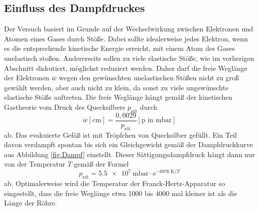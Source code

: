 \subsection{Einfluss des Dampfdruckes}
Der Versuch basiert im Grunde auf der Wechselwirkung zwischen Elektronen und Atomen eines Gases durch Stöße.
Dabei sollte idealerweise jedes Elektron, wenn es die entsprechende kinetische Energie erreicht, mit 
einem Atom des Gases unelastisch stoßen. Andererseits sollen zu viele elastische Stöße, wie im vorherigen Abschnitt diskutiert, möglichst 
reduziert werden. Daher darf die freie Weglänge der Elektronen $\overline{w}$ wegen den gewünschten 
unelastischen Stößen nicht zu groß gewählt werden, aber auch nicht zu klein, da sonst zu viele ungewünschte elastische Stöße auftreten. Die freie Weglänge hängt 
gemäß der kinetischen Gastheorie vom Druck des Quecksilbers $p_\text{sät}$ durch 
\begin{equation}
    \overline{w}[\text{cm}]=\frac{0,0029}{p_\text{sät}}[\text{p in mbar}]
    \label{eq:freieW}
\end{equation}
ab. Das evakuierte Gefäß ist mit Tröpfchen von Quecksilber gefüllt. Ein Teil davon 
verdampft spontan bis sich ein Gleichgewicht gemäß der Dampfdruckkurve aus Abbildung 
\ref{fig:Dampf} einstellt. Dieser Sättigungsdampfdruck hängt dann nur von der Temperatur $T$ 
gemäß der Formel 
\begin{equation}
    p_\text{sät}=\qty{5.5e7}{\milli\bar}\cdot \text{e}^{-\qty{6876}{\kelvin}/T}
    \label{eq:Druck}
\end{equation}
ab. Optimalerweise wird die Temperatur der Franck-Hertz-Apparatur so eingestellt, dass die freie Weglänge etwa 
1000 bis 4000 mal kleiner ist als die Länge der Röhre. 
